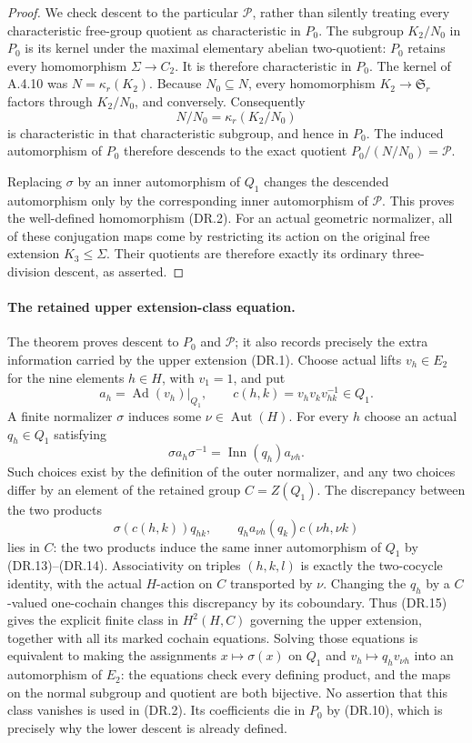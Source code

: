 \begin{proof}
We check descent to the particular $\mathcal P$,
rather than silently treating every characteristic
free-group quotient as characteristic in $P_0$.
The subgroup $K_2/N_0$ in $P_0$ is its kernel under
the maximal elementary abelian two-quotient:
$P_0$ retains every homomorphism $\Sigma\to C_2$.
It is therefore characteristic in $P_0$.
The kernel of A.4.10 was
$N=\kappa_r(K_2)$.
Because $N_0\subseteq N$, every homomorphism
$K_2\to\mathfrak S_r$ factors through $K_2/N_0$,
and conversely.  Consequently
\[
 N/N_0=\kappa_r(K_2/N_0)
                                                        \tag{DR.12}
\]
is characteristic in that characteristic subgroup,
and hence in $P_0$.
The induced automorphism of $P_0$ therefore descends
to the exact quotient $P_0/(N/N_0)=\mathcal P$.

Replacing $\sigma$ by an inner automorphism of $Q_1$
changes the descended automorphism only by the
corresponding inner automorphism of $\mathcal P$.
This proves the well-defined homomorphism (DR.2).
For an actual geometric normalizer, all of these
conjugation maps come by restricting its action on
the original free extension $K_3\leq\Sigma$.
Their quotients are therefore exactly its ordinary
three-division descent, as asserted.
\end{proof}

\paragraph{The retained upper extension-class equation.}
The theorem proves descent to $P_0$ and $\mathcal P$;
it also records precisely the extra information
carried by the upper extension (DR.1).
Choose actual lifts $v_h\in E_2$ for the nine elements
$h\in H$, with $v_1=1$, and put
\[
 a_h=\operatorname{Ad}(v_h)|_{Q_1},\qquad
 c(h,k)=v_hv_kv_{hk}^{-1}\in Q_1.                       \tag{DR.13}
\]
A finite normalizer $\sigma$ induces some
$\nu\in\operatorname{Aut}(H)$.
For every $h$ choose an actual $q_h\in Q_1$ satisfying
\[
 \sigma a_h\sigma^{-1}
       =\operatorname{Inn}(q_h)a_{\nu h}.
                                                        \tag{DR.14}
\]
Such choices exist by the definition of the outer
normalizer, and any two choices differ by an element
of the retained group $C=Z(Q_1)$.
The discrepancy between the two products
\[
 \sigma(c(h,k))q_{hk},\qquad
 q_h a_{\nu h}(q_k)c(\nu h,\nu k)                     \tag{DR.15}
\]
lies in $C$: the two products induce the same inner
automorphism of $Q_1$ by (DR.13)--(DR.14).
Associativity on triples $(h,k,l)$ is exactly the
two-cocycle identity, with the actual $H$-action on
$C$ transported by $\nu$.
Changing the $q_h$ by a $C$-valued one-cochain changes
this discrepancy by its coboundary.
Thus (DR.15) gives the explicit finite class in
$H^2(H,C)$ governing the upper extension, together
with all its marked cochain equations.
Solving those equations is equivalent to making
the assignments $x\mapsto\sigma(x)$ on $Q_1$ and
$v_h\mapsto q_hv_{\nu h}$ into an automorphism of
$E_2$: the equations check every defining product,
and the maps on the normal subgroup and quotient
are both bijective.
No assertion that this class vanishes is used in
(DR.2).  Its coefficients die in $P_0$ by (DR.10),
which is precisely why the lower descent is already
defined.

